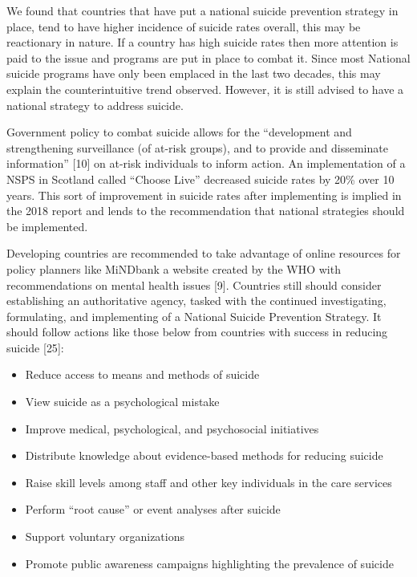 \documentclass[]{article}
\begin{document}
We found that countries that have put a national suicide prevention
strategy in place, tend to have higher incidence of suicide rates
overall, this may be reactionary in nature. If a country has high
suicide rates then more attention is paid to the issue and programs are
put in place to combat it. Since most National suicide programs have
only been emplaced in the last two decades, this may explain the
counterintuitive trend observed. However, it is still advised to have a
national strategy to address suicide.

Government policy to combat suicide allows for the ``development and
strengthening surveillance (of at-risk groups), and to provide and
disseminate information'' {[}10{]} on at-risk individuals to inform
action. An implementation of a NSPS in Scotland called ``Choose Live''
decreased suicide rates by 20\% over 10 years. This sort of improvement
in suicide rates after implementing is implied in the 2018 report and
lends to the recommendation that national strategies should be
implemented.

Developing countries are recommended to take advantage of online
resources for policy planners like MiNDbank a website created by the WHO
with recommendations on mental health issues {[}9{]}. Countries still
should consider establishing an authoritative agency, tasked with the
continued investigating, formulating, and implementing of a National
Suicide Prevention Strategy. It should follow actions like those below
from countries with success in reducing suicide {[}25{]}:

\begin{itemize}
  \item Reduce access to means and methods of suicide 
  \item View suicide as a psychological mistake
  \item Improve medical, psychological, and psychosocial initiatives
  \item Distribute knowledge about evidence-based methods for reducing suicide
  \item Raise skill levels among staff and other key individuals in the care services
  \item Perform “root cause” or event analyses after suicide
  \item Support voluntary organizations 
  \item Promote public awareness campaigns highlighting the prevalence of suicide
\end{itemize}
\end{document}
